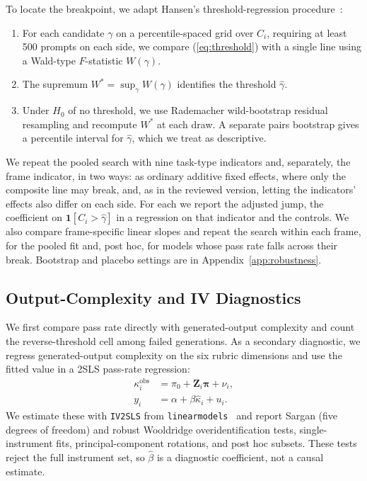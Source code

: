 \documentclass{article}
\begin{document}
To locate the breakpoint, we adapt Hansen's threshold-regression procedure~\cite{hansen2000sample}:
\begin{enumerate}
\item For each candidate $\gamma$ on a percentile-spaced grid over $C_i$, requiring at least 500 prompts on each side, we compare (\ref{eq:threshold}) with a single line using a Wald-type $F$-statistic $W(\gamma)$.
\item The supremum $W^* = \sup_\gamma W(\gamma)$ identifies the threshold $\hat{\gamma}$.
\item Under $H_0$ of no threshold, we use Rademacher wild-bootstrap residual resampling and recompute $W^*$ at each draw. A separate pairs bootstrap gives a percentile interval for $\hat{\gamma}$, which we treat as descriptive.
\end{enumerate}
We repeat the pooled search with nine task-type indicators and, separately, the frame indicator, in two ways: as ordinary additive fixed effects, where only the composite line may break, and, as in the reviewed version, letting the indicators' effects also differ on each side. For each we report the adjusted jump, the coefficient on $\mathbf{1}[C_i>\hat{\gamma}]$ in a regression on that indicator and the controls. We also compare frame-specific linear slopes and repeat the search within each frame, for the pooled fit and, post hoc, for models whose pass rate falls across their break. Bootstrap and placebo settings are in Appendix~\ref{app:robustness}.

\subsection{Output-Complexity and IV Diagnostics}\label{sec:hansen-j}
We first compare pass rate directly with generated-output complexity and count the reverse-threshold cell among failed generations. As a secondary diagnostic, we regress generated-output complexity on the six rubric dimensions and use the fitted value in a 2SLS pass-rate regression:
\begin{align}
\kappa_i^{\mathrm{obs}} &= \pi_0+\mathbf{Z}_i\boldsymbol{\pi}+\nu_i, \label{eq:stage1}\\
y_i &= \alpha+\beta\widehat{\kappa}_i+u_i. \label{eq:stage2}
\end{align}
We estimate these with \texttt{IV2SLS} from \texttt{linearmodels}~\cite{linearmodels} and report Sargan (five degrees of freedom) and robust Wooldridge overidentification tests, single-instrument fits, principal-component rotations, and post hoc subsets. These tests reject the full instrument set, so $\hat{\beta}$ is a diagnostic coefficient, not a causal estimate.
\end{document}
